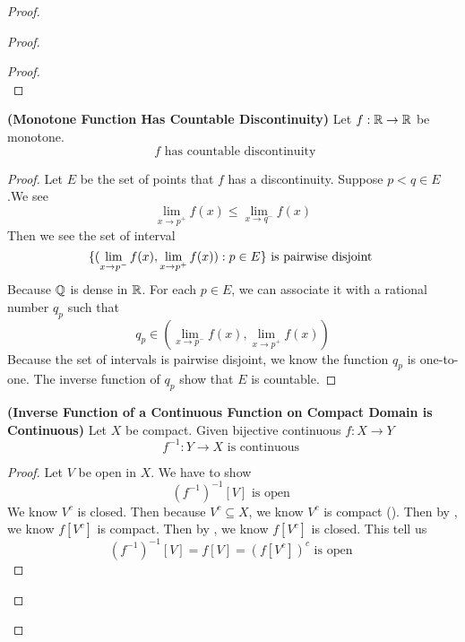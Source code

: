 \documentclass{report}
\begin{document}
\begin{proof}
\begin{proof}
\begin{proof}
\begin{equation*}
\end{equation*}
\end{proof}
\begin{theorem}
\label{3.11.17}
\textbf{(Monotone Function Has Countable Discontinuity)} Let $f:\mathbb{R}\rightarrow \mathbb{R}$ be monotone. 
\begin{equation*}
\text{ $f$ has countable discontinuity }
\end{equation*}
\end{theorem}
\begin{proof}
Let $E$ be the set of points that $f$ has a discontinuity. Suppose $p<q \in E$.We see 
\begin{equation*}
  \lim_{x\to p^+}f(x)\leq \lim_{x\to q^-}f(x)
\end{equation*}
Then we see the set of interval
\begin{equation*}
\{ (\lim_{x\to p^- }f(x),\lim_{x\to p^+}f(x)):p \in E \}\text{ is pairwise disjoint }
\end{equation*}
Because $\mathbb{Q}$ is dense in $\mathbb{R}$.  For each $p\in  E$, we can associate it with 
a rational number $q_p$ such that 
 \begin{equation*}
q_p \in (\lim_{x\to p^-}f(x),\lim_{x\to p^+}f(x))
\end{equation*}
Because the set of intervals is pairwise disjoint, we know the function  $q_p$ is one-to-one. The inverse function of $q_p$ show that  $E$ is countable.
\end{proof}
\begin{theorem}
\label{3.11.18}
\textbf{(Inverse Function of a Continuous Function on Compact Domain is Continuous)} Let $X$ be compact. Given bijective continuous  $f:X\rightarrow Y$
\begin{equation*}
f^{-1}:Y\rightarrow X\text{ is continuous }
\end{equation*}
\end{theorem}
\begin{proof}
Let $V$ be open in $X$. We have to show 
 \begin{equation*}
   (f^{-1})^{-1}[V]\text{ is open }
\end{equation*}
We know $V^c$ is closed. Then because $V^c\subseteq X$, we know $V^c$ is compact  (). Then by , we know $f[V^c]$ is compact. Then by , we know $f[V^c]$ is closed. This tell us 
\begin{equation*}
  (f^{-1})^{-1}[V]=f[V]=(f[V^c])^c\text{ is open }
\end{equation*}
\end{proof}

\end{proof}
\end{proof}
\end{document}

